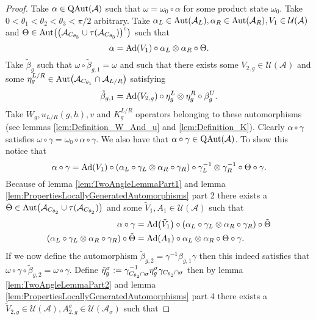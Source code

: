\documentclass[12pt,a4paper,twoside]{article}
\newcommand{\defeq}{\vcentcolon=}
\let\originalleft\left
\let\originalright\right
\renewcommand{\left}{\mathopen{}\mathclose\bgroup\originalleft}
\renewcommand{\right}{\aftergroup\egroup\originalright}
\newcommand{\UU}{\mathcal U}
\renewcommand{\AA}{\mathcal A}
\newcommand{\Ad}[1]{\textrm{Ad}\left(#1\right)}
\newcommand{\Aut}[1]{\textrm{Aut}\left(#1\right)}
\newcommand{\QAut}[1]{\textrm{QAut}\left(#1\right)}
\theoremstyle{definition}
\numberwithin{equation}{section}
\begin{document}
\begin{proof}
	Take $\alpha\in\QAut{\AA}$ such that $\omega=\omega_0\circ\alpha$ for some product state $\omega_0$. Take $0<\theta_1<\theta_2<\theta_3<\pi/2$ arbitrary. Take $\alpha_L\in\Aut{\AA_L},\alpha_R\in\Aut{\AA_R},V_1\in\UU(\AA)$ and $\Theta\in\Aut{\left(\AA_{C_{\theta_3}} \cup \tau(\AA_{C_{\theta_3}})\right)^c}$ such that
	\begin{equation}
		\alpha=\Ad{V_1}\circ\alpha_L\otimes\alpha_R\circ\Theta.
	\end{equation}
	Take $\tilde{\beta}_g$ such that $\omega\circ\tilde{\beta}_{g,1}=\omega$ and such that there exists some $V_{2,g}\in\UU(\AA)$ and some $\eta_g^{L/R}\in\Aut{\AA_{C_{\theta_1}}\cap\AA_{L/R}}$ satisfying
	\begin{equation}
		\tilde{\beta}_{g,1}=\Ad{V_{2,g}}\circ\eta_{g}^L\otimes\eta_{g}^R\circ\beta_g^U.
	\end{equation}
	Take $W_g,u_{L/R}(g,h),v$ and $K_g^{L/R}$ operators belonging to these automorphisms (see lemmas \ref{lem:Definition_W_And_u} and \ref{lem:Definition_K}). Clearly $\alpha\circ\gamma$ satisfies $\omega\circ\gamma=\omega_0\circ\alpha\circ\gamma$. We also have that $\alpha\circ\gamma\in\QAut{\AA}$. To show this notice that
	\begin{equation}
		\alpha\circ\gamma=\Ad{V_1}\circ(\alpha_L\circ\gamma_{L}\otimes\alpha_R\circ\gamma_{R})\circ\gamma_{L}^{-1}\otimes\gamma_{R}^{-1}\circ\Theta\circ\gamma.
	\end{equation}
	Because of lemma \ref{lem:TwoAngleLemmaPart1} and lemma \ref{lem:PropertiesLocallyGeneratedAutomorphisms} part 2 there exists a $\tilde{\Theta}\in\Aut{\AA_{C_{\theta_2}}\cup\tau(\AA_{C_{\theta_2}})}$ and some $\tilde V_1,A_1\in\UU(\AA)$ such that
	\begin{align}
		\alpha\circ\gamma&=\Ad{\tilde V_1}\circ(\alpha_L\circ\gamma_{L}\otimes\alpha_R\circ\gamma_{R})\circ\tilde\Theta\\
		(\alpha_L\circ\gamma_{L}\otimes\alpha_R\circ\gamma_{R})\circ\tilde\Theta&=\Ad{A_1}\circ \alpha_L\otimes\alpha_R\circ\Theta\circ\gamma.
	\end{align}
	If we now define the automorphism $\tilde{\beta}_{g,2}=\gamma^{-1}\beta_{g,1}\gamma$ then this indeed satisfies that $\omega\circ\gamma\circ\tilde{\beta}_{g,2}=\omega\circ\gamma$. Define $\tilde\eta_g^\sigma\defeq\gamma_{C_{\theta_2}\cap\sigma}^{-1}\eta_g^\sigma\gamma_{C_{\theta_2}\cap\sigma}$ then by lemma \ref{lem:TwoAngleLemmaPart2} and lemma \ref{lem:PropertiesLocallyGeneratedAutomorphisms} part 4 there exists a $\tilde V_{2,g}\in\UU(\AA),A_{2,g}^{\sigma}\in\UU(\AA_\sigma)$ such that

\end{proof}
\end{document}
